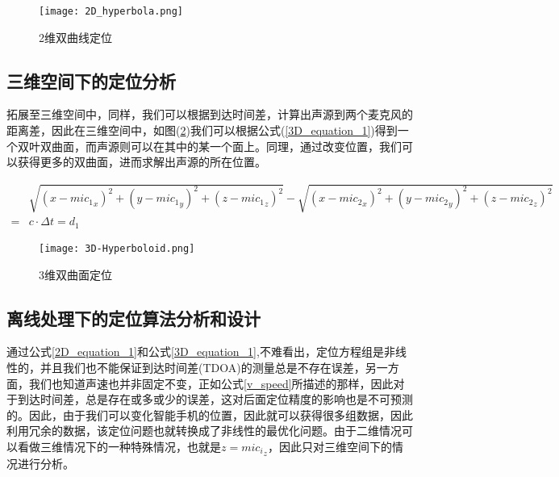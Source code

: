 \documentclass[winfonts]{njuthesis}
\begin{document}
		\begin{figure}[H]
			\centering
			\texttt{[image: 2D\_hyperbola.png]} 
			\caption{2维双曲线定位}
			\label{fig: 2D_hyperbola}
		\end{figure}		
		
		\subsection{三维空间下的定位分析}
		
		拓展至三维空间中，同样，我们可以根据到达时间差，计算出声源到两个麦克风的距离差，因此在三维空间中，如图(\ref{fig: 3D-Hyperboloid})我们可以根据公式(\ref{3D_equation_1})得到一个双叶双曲面，而声源则可以在其中的某一个面上。同理，通过改变位置，我们可以获得更多的双曲面，进而求解出声源的所在位置。
		
		\begin{equation}
		\begin{aligned}
			&\sqrt{(x-{mic_1}_x)^2+(y-{mic_1}_y)^2+(z-{mic_1}_z)^2} - \sqrt{(x-{mic_2}_x)^2+(y-{mic_2}_y)^2+(z-{mic_2}_z)^2}\\
		  = & c \cdot \Delta t= d_1 \label{3D_equation_1}
		\end{aligned}
		\end{equation}
		
		\begin{figure}[H]
			\centering
			\texttt{[image: 3D-Hyperboloid.png]} 
			\caption{3维双曲面定位}
			\label{fig: 3D-Hyperboloid}
		\end{figure}	
		
		\subsection{离线处理下的定位算法分析和设计}
		
		通过公式\ref{2D_equation_1}和公式\ref{3D_equation_1},不难看出，定位方程组是非线性的，并且我们也不能保证到达时间差(TDOA)的测量总是不存在误差，另一方面，我们也知道声速也并非固定不变，正如公式\ref{v_speed}所描述的那样，因此对于到达时间差，总是存在或多或少的误差，这对后面定位精度的影响也是不可预测的。因此，由于我们可以变化智能手机的位置，因此就可以获得很多组数据，因此利用冗余的数据，该定位问题也就转换成了非线性的最优化问题。由于二维情况可以看做三维情况下的一种特殊情况，也就是$z = {mic_i}_z$，因此只对三维空间下的情况进行分析。
		
\end{document}
